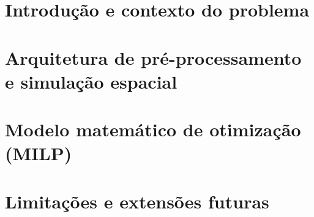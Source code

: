 \newpage
\thispagestyle{empty} 

\tableofcontents 

\newpage


\section{Introdução e contexto do problema}
\label{sec:introducao}


\newpage
\section{Arquitetura de pré-processamento e simulação espacial}
\label{sec:pre_processamento}


\newpage
\section{Modelo matemático de otimização (MILP)}
\label{sec:modelo}


\newpage
\section{Limitações e extensões futuras}
\label{sec:extensoes}


